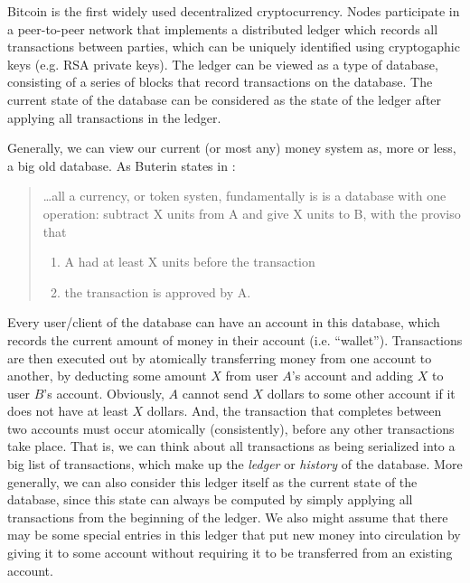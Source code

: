 \documentclass[10pt,a4paper]{article}
\begin{document}
Bitcoin \cite{nakamoto2009bitcoin} is the first widely used decentralized cryptocurrency. Nodes participate in a peer-to-peer network that implements a distributed ledger which records all transactions between parties, which can be uniquely identified using cryptogaphic keys (e.g. RSA private keys). The ledger can be viewed as a type of database, consisting of a series of blocks that record transactions on the database. The current state of the database can be considered as the state of the ledger after applying all transactions in the ledger.

Generally, we can view our current (or most any) money system as, more or less, a big old database. As Buterin states in \cite{Buterin2013}:

\begin{quote}
    \dots all a currency, or token systen, fundamentally is is a database with one operation: subtract X units from A and give X units to B, with the proviso that 
    \begin{enumerate}[(1)]
        \item A had at least X units before the transaction
        \item the transaction is approved by A. 
    \end{enumerate}
\end{quote}

Every user/client of the database can have an account in this database, which records the current amount of money in their account (i.e. ``wallet''). Transactions are then executed out by atomically transferring money from one account to another, by deducting some amount $X$ from user $A$'s account and adding $X$ to user $B$'s account. Obviously, $A$ cannot send $X$ dollars to some other account if it does not have at least $X$ dollars. And, the transaction that completes between two accounts must occur atomically (consistently), before any other transactions take place. That is, we can think about all transactions as being serialized into a big list of transactions, which make up the \textit{ledger} or \textit{history} of the database. More generally, we can also consider this ledger itself as the current state of the database, since this state can always be computed by simply applying all transactions from the beginning of the ledger. We also might assume that there may be some special entries in this ledger that put new money into circulation by giving it to some account without requiring it to be transferred from an existing account.
\end{document}
